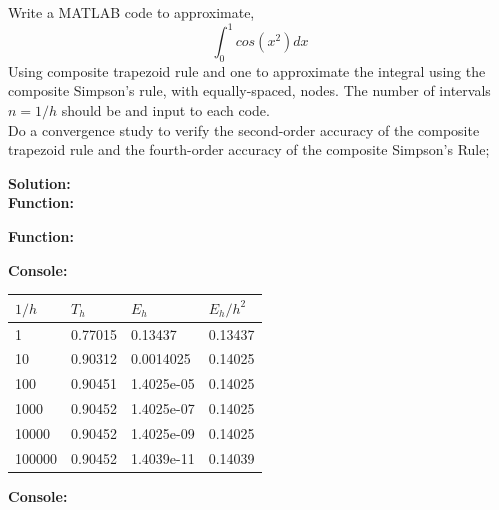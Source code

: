 \documentclass[12pt]{article}
\makeatletter
\theoremstyle{homework}
\newenvironment{exercise}[1]
{\def\@currentlabel{#1}\exercisecore}
{\endexercisecore}
\newcommand{\localhead}[1]{\par\smallskip\noindent\textbf{#1}\nobreak\\}%
\newcommand\solution{\localhead{Solution:}}
\makeatother
\begin{document}
\begin{exercise}{Problem 10.7} Write a MATLAB code to approximate,
    \begin{equation*}
        \int_0^1 cos(x^2) dx
    \end{equation*}
    Using composite trapezoid rule and one to approximate the integral using the composite Simpson's rule, with equally-spaced, nodes.
    The number of intervals $n = 1/h$ should be and input to each code.\\
    Do a convergence study to verify the second-order accuracy of the composite trapezoid rule and the fourth-order accuracy of the 
    composite Simpson's Rule;\\

    \solution
    \textbf{Function:}
    \begin{center}
    
    \end{center}
    
    \textbf{Function:}
    \begin{center}
    
    \end{center}

    \textbf{Console:}
    \begin{center}
    
    \end{center}
    
    \begin{center}
    \begin{tabular}{llll}
        $1/h$ & $T_h$ & $E_h$ & $E_h/h^2$ \\ 
        \hline 
        1 & 0.77015 & 0.13437 & 0.13437 \\ 
        10 & 0.90312 & 0.0014025 & 0.14025 \\ 
        100 & 0.90451 & 1.4025e-05 & 0.14025 \\ 
        1000 & 0.90452 & 1.4025e-07 & 0.14025 \\ 
        10000 & 0.90452 & 1.4025e-09 & 0.14025 \\ 
        100000 & 0.90452 & 1.4039e-11 & 0.14039 \\ 
        \hline 
    \end{tabular}
    \end{center}

    \textbf{Console:}
    \begin{center}
    
    \end{center}


\end{exercise}
\end{document}

